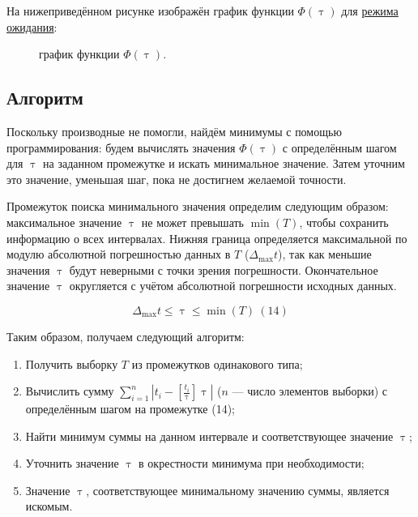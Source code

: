 \documentclass[12pt]{report}
\let\tau\uptau
\begin{document}
На нижеприведённом рисунке изображён график функции $\Phi(\tau)$ для \hyperref[sec:wait]{режима ожидания}:
\begin{figure}[ht]
    \centering
    \caption{график функции $\Phi(\tau)$.}
\end{figure}

\subsection{\textbf{Алгоритм}}

Поскольку производные не помогли, найдём минимумы с помощью программирования: будем вычислять значения $\Phi(\tau)$ с определённым шагом для $\tau$ на заданном промежутке и искать минимальное значение. Затем уточним это значение, уменьшая шаг, пока не достигнем желаемой точности.

Промежуток поиска минимального значения определим следующим образом: максимальное значение $\tau$ не может превышать $\min(T)$, чтобы сохранить информацию о всех интервалах. Нижняя граница определяется максимальной по модулю абсолютной погрешностью данных в $T$ ($\Delta_{\max} t$), так как меньшие значения $\tau$ будут неверными с точки зрения погрешности. Окончательное значение $\tau$ округляется с учётом абсолютной погрешности исходных данных.

$$\Delta_{\max} t \leq \tau \leq \min(T)\ (14)$$

Таким образом, получаем следующий алгоритм:
\begin{enumerate}
    \item Получить выборку $T$ из промежутков одинакового типа;
    \item Вычислить сумму $\sum_{i=1}^n \left|t_i - \left[\frac{t_i}{\tau}\right]\tau\right|$ ($n$ — число элементов выборки) с определённым шагом на промежутке (14);
    \item Найти минимум суммы на данном интервале и соответствующее значение $\tau$;
    \item Уточнить значение $\tau$ в окрестности минимума при необходимости;
    \item Значение $\tau$, соответствующее минимальному значению суммы, является искомым.
\end{enumerate}
\end{document}
